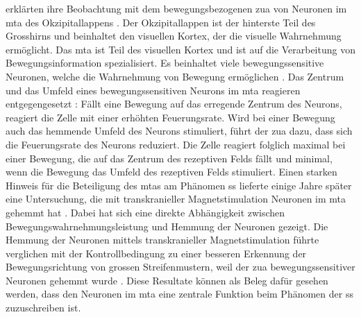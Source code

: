 \documentclass[11pt, twoside, a4paper]{book}		%
\begin{document}
\citet{Tadin2003} erklärten ihre Beobachtung mit dem bewegungsbezogenen \gls{zua} von Neuronen im \gls{mta} des Okzipitallappens \citep{Allman1985a}. 
Der Okzipitallappen ist der hinterste Teil des Grosshirns und beinhaltet den visuellen Kortex, der die visuelle Wahrnehmung ermöglicht. 
Das \gls{mta} ist Teil des visuellen Kortex und ist auf die Verarbeitung von Bewegungsinformation spezialisiert. Es beinhaltet viele bewegungssensitive Neuronen, welche die Wahrnehmung von Bewegung ermöglichen \citep{Goldstein2015}.
Das Zentrum und das Umfeld eines bewegungssensitiven Neurons im \gls{mta} reagieren entgegengesetzt \citep{Allman1985a}: Fällt eine Bewegung auf das erregende Zentrum des Neurons, reagiert die Zelle mit einer erhöhten Feuerungsrate. Wird bei einer Bewegung auch das hemmende Umfeld des Neurons stimuliert, führt der \gls{zua} dazu, dass sich die Feuerungsrate des Neurons reduziert. Die Zelle reagiert folglich maximal bei einer Bewegung, die auf das Zentrum des rezeptiven Felds fällt und minimal, wenn die Bewegung das Umfeld des rezeptiven Felds stimuliert. Einen starken Hinweis für die Beteiligung des \gls{mta}s am Phänomen \gls{ss} lieferte einige Jahre später eine Untersuchung, die mit transkranieller Magnetstimulation Neuronen im \gls{mta} gehemmt hat \citep{Tadin2011}. Dabei hat sich eine direkte Abhängigkeit zwischen Bewegungswahrnehmungsleistung und Hemmung der Neuronen gezeigt. Die Hemmung der Neuronen mittels transkranieller Magnetstimulation führte verglichen mit der Kontrollbedingung zu einer besseren Erkennung der Bewegungsrichtung von grossen Streifenmustern,  weil der \gls{zua} bewegungssensitiver Neuronen gehemmt wurde \citep{Tadin2011}. Diese Resultate können als Beleg dafür gesehen werden, dass den Neuronen im \gls{mta} eine zentrale Funktion beim Phänomen der \gls{ss} zuzuschreiben ist.
\end{document}
